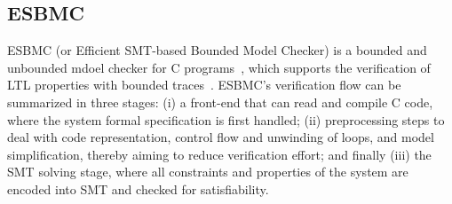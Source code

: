 \documentclass[10pt,conference]{IEEEtran}
\begin{document}
\subsection{ESBMC}
ESBMC (or Efficient SMT-based Bounded Model Checker) is a bounded and unbounded mdoel checker for C programs~\cite{esbmc2018}, which supports the verification of LTL properties with bounded traces~\cite{DBLP:journals/sosym/MorseCN015}. ESBMC's verification flow can be summarized in three stages: (i) a front-end that can read and compile C code, where the system formal specification is first handled; (ii) preprocessing steps to deal with code representation, control flow and unwinding of loops, and model simplification, thereby aiming to reduce verification effort; and finally (iii) the SMT solving stage, where all constraints and properties of the system are encoded into SMT and checked for satisfiability. %

\end{document}
